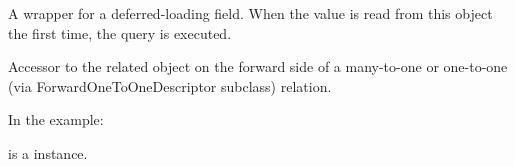\documentclass[letterpaper,10pt,english]{sphinxmanual}
\begin{document}
\begin{fulllineitems}
\begin{fulllineitems}
\end{fulllineitems}


\begin{fulllineitems}
\label{\detokenize{modules/models:users.models.HistoricalSchool.history_object}}
\end{fulllineitems}


\begin{fulllineitems}
\label{\detokenize{modules/models:users.models.HistoricalSchool.history_type}}
A wrapper for a deferred-loading field. When the value is read from this
object the first time, the query is executed.

\end{fulllineitems}


\begin{fulllineitems}
\label{\detokenize{modules/models:users.models.HistoricalSchool.history_user}}
Accessor to the related object on the forward side of a many-to-one or
one-to-one (via ForwardOneToOneDescriptor subclass) relation.

In the example:

\begin{sphinxVerbatim}[commandchars=\\\{\}]
 
       
\end{sphinxVerbatim}

 is a  instance.

\end{fulllineitems}


\end{fulllineitems}
\end{document}
